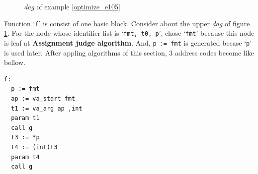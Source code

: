 \begin{Example}
\begin{figure}[htbp]
\begin{center}
\caption{{\em dag} of example \ref{optimize_e105}}
\label{optimize_e106}
\end{center}
\end{figure}
Function `{\tt{f}}' is consist of one basic block. Consider about
the upper {\em dag} of figure \ref{optimize_e106}.
For the node whose identifier list is `{\tt{fmt, t0, p}}',
chose `{\tt{fmt}}' because this node is leaf
at {\bf Assignment judge algorithm}.
And, {\tt{p := fmt}} is generated becase `{\tt{p}}' is used later.
After appling algorithms of this section,
3 address codes become like bellow.
\begin{verbatim}
f:
  p := fmt
  ap := va_start fmt
  t1 := va_arg ap ,int
  param t1
  call g
  t3 := *p
  t4 := (int)t3
  param t4
  call g
\end{verbatim}
\end{Example}
